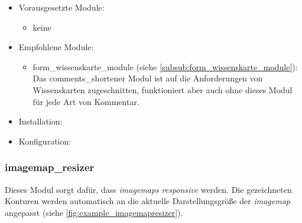 \begin{itemize}[parsep=0pt, itemsep=5.0pt plus 2.0pt minus 1.0pt, leftmargin=*]
	\item Vorausgesetzte Module: 
	
	\begin{itemize}
		\item keine
	\end{itemize}


	\item Empfohlene Module:

	\begin{itemize}
		\item form\_wissenskarte\_module (siehe \cref{subsub:form_wissenskarte_module}): Das comments\_shortener Modul ist auf die Anforderungen von Wissenskarten zugeschnitten, funktioniert aber auch ohne dieses Modul für jede Art von Kommentar.
	\end{itemize}


	\item Installation: \standardinstall

	\item Konfiguration:

	\noconfig

\end{itemize}



\newpage
\subsubsection{imagemap\_resizer}\label{subsub:imagemapresizer}
Dieses Modul sorgt dafür, dass \textit{\glspl{imagemap}} \textit{responsive} werden. Die gezeichneten Konturen werden automatisch an die aktuelle Darstellungsgröße der \textit{\gls{imagemap}} angepasst (siehe \cref{fig:example_imagemapresizer}).

